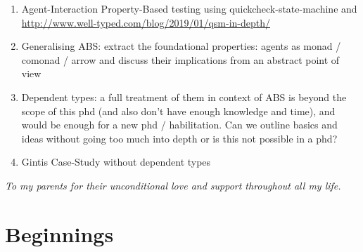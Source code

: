 \documentclass[oneside]{book}
\begin{document}
\begin{enumerate}
	\item Agent-Interaction Property-Based testing using quickcheck-state-machine and \cite{de_vries_-depth_2019} \url{http://www.well-typed.com/blog/2019/01/qsm-in-depth/}
	
	\item Generalising ABS: extract the foundational properties: agents as monad / comonad / arrow and discuss their implications from an abstract point of view
	
	\item Dependent types: a full treatment of them in context of ABS is beyond the scope of this phd (and also don't have enough knowledge and time), and would be enough for a new phd / habilitation. Can we outline basics and ideas without going too much into depth or is this not possible in a phd?
	
	\item Gintis Case-Study without dependent types
\end{enumerate}

\clearpage
\tableofcontents
\clearpage
\textit{To my parents for their unconditional love and support throughout all my life.}
\clearpage



\epigraphhead[450]{}
\part{Beginnings}









\epigraphhead[450]{}
\end{document}
